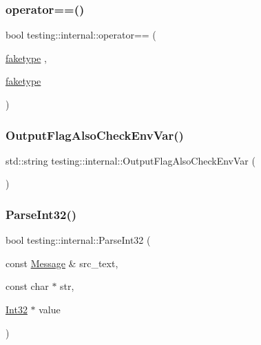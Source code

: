 \mbox{\label{namespacetesting_1_1internal_a5e3e473798de3189e9343132bcfd4fea}} 
\subsubsection{\texorpdfstring{operator==()}{operator==()}}
{\footnotesize\ttfamily bool testing\+::internal\+::operator== (\begin{DoxyParamCaption}\item[{\hyperlink{structtesting_1_1internal_1_1faketype}{faketype}}]{,  }\item[{\hyperlink{structtesting_1_1internal_1_1faketype}{faketype}}]{ }\end{DoxyParamCaption})\hspace{0.3cm}{\ttfamily [inline]}}

\mbox{\label{namespacetesting_1_1internal_a0c793c6d84760d900299916c077a1af4}} 
\subsubsection{\texorpdfstring{Output\+Flag\+Also\+Check\+Env\+Var()}{OutputFlagAlsoCheckEnvVar()}}
{\footnotesize\ttfamily std\+::string testing\+::internal\+::\+Output\+Flag\+Also\+Check\+Env\+Var (\begin{DoxyParamCaption}{ }\end{DoxyParamCaption})}

\mbox{\label{namespacetesting_1_1internal_ac06fc81336a3d80755f4020d34321766}} 
\subsubsection{\texorpdfstring{Parse\+Int32()}{ParseInt32()}}
{\footnotesize\ttfamily bool testing\+::internal\+::\+Parse\+Int32 (\begin{DoxyParamCaption}\item[{const \hyperlink{classtesting_1_1Message}{Message} \&}]{src\+\_\+text,  }\item[{const char $\ast$}]{str,  }\item[{\hyperlink{namespacetesting_1_1internal_a8ee38faaf875f133358abaf9bc056cec}{Int32} $\ast$}]{value }\end{DoxyParamCaption})}

